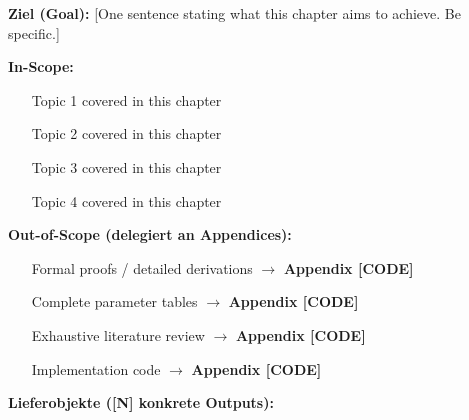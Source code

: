 %
%
%
\begin{tcolorbox}[
    colback=purple!5!white,
    colframe=purple!75!black,
    title={\textbf{Chapter Scope: Ziel / In-Scope / Out-of-Scope / Lieferobjekte}},
    fonttitle=\bfseries
]

\textbf{Ziel (Goal):}
[One sentence stating what this chapter aims to achieve. Be specific.]

\vspace{0.3cm}
\textbf{In-Scope:}
\begin{itemize}[nosep]
\item [Topic 1 covered in this chapter]
\item [Topic 2 covered in this chapter]
\item [Topic 3 covered in this chapter]
\item [Topic 4 covered in this chapter]
\end{itemize}

\vspace{0.3cm}
\textbf{Out-of-Scope (delegiert an Appendices):}
\begin{itemize}[nosep]
\item [Formal proofs / detailed derivations] $\to$ \textbf{Appendix [CODE]}
\item [Complete parameter tables] $\to$ \textbf{Appendix [CODE]}
\item [Exhaustive literature review] $\to$ \textbf{Appendix [CODE]}
\item [Implementation code] $\to$ \textbf{Appendix [CODE]}
\end{itemize}

\vspace{0.3cm}
\textbf{Lieferobjekte ([N] konkrete Outputs):}


\end{tcolorbox}
